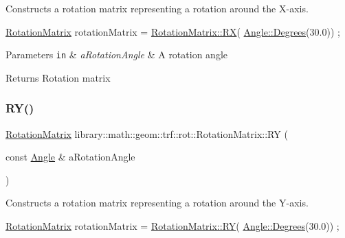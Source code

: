 Constructs a rotation matrix representing a rotation around the X-\/axis. 


\begin{DoxyCode}
\hyperlink{classlibrary_1_1math_1_1geom_1_1trf_1_1rot_1_1_rotation_matrix_a667d2c05aa5b0cc88775938d11164cdc}{RotationMatrix} rotationMatrix = \hyperlink{classlibrary_1_1math_1_1geom_1_1trf_1_1rot_1_1_rotation_matrix_afe1aa8480e121065aa0c35fdf273811c}{RotationMatrix::RX}(
      \hyperlink{classlibrary_1_1math_1_1geom_1_1_angle_a64aa53e8420aeb6f671d86c65c370bc8}{Angle::Degrees}(30.0)) ;
\end{DoxyCode}



\begin{DoxyParams}[1]{Parameters}
\mbox{\tt in}  & {\em a\+Rotation\+Angle} & A rotation angle \\
\hline
\end{DoxyParams}
\begin{DoxyReturn}{Returns}
Rotation matrix 
\end{DoxyReturn}
\mbox{\label{classlibrary_1_1math_1_1geom_1_1trf_1_1rot_1_1_rotation_matrix_a165cef74c455c3651bd33cb2a86d2a93}} 
\subsubsection{\texorpdfstring{R\+Y()}{RY()}}
{\footnotesize\ttfamily \hyperlink{classlibrary_1_1math_1_1geom_1_1trf_1_1rot_1_1_rotation_matrix}{Rotation\+Matrix} library\+::math\+::geom\+::trf\+::rot\+::\+Rotation\+Matrix\+::\+RY (\begin{DoxyParamCaption}\item[{const \hyperlink{classlibrary_1_1math_1_1geom_1_1_angle}{Angle} \&}]{a\+Rotation\+Angle }\end{DoxyParamCaption})\hspace{0.3cm}{\ttfamily [static]}}



Constructs a rotation matrix representing a rotation around the Y-\/axis. 


\begin{DoxyCode}
\hyperlink{classlibrary_1_1math_1_1geom_1_1trf_1_1rot_1_1_rotation_matrix_a667d2c05aa5b0cc88775938d11164cdc}{RotationMatrix} rotationMatrix = \hyperlink{classlibrary_1_1math_1_1geom_1_1trf_1_1rot_1_1_rotation_matrix_a165cef74c455c3651bd33cb2a86d2a93}{RotationMatrix::RY}(
      \hyperlink{classlibrary_1_1math_1_1geom_1_1_angle_a64aa53e8420aeb6f671d86c65c370bc8}{Angle::Degrees}(30.0)) ;
\end{DoxyCode}



